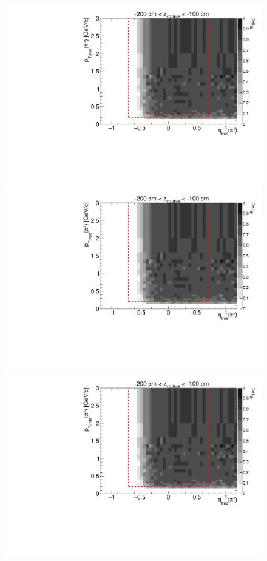 \begin{figure}[hb]\ContinuedFloat
\centering
\parbox{0.495\textwidth}{
  \centering
  \includegraphics[width=\linewidth,page=11]{graphics/eff/Eff2D_TPC_pion_Plus.pdf}\\
  \includegraphics[width=\linewidth,page=13]{graphics/eff/Eff2D_TPC_pion_Plus.pdf}\\
  \includegraphics[width=\linewidth,page=15]{graphics/eff/Eff2D_TPC_pion_Plus.pdf}\\
}
\end{figure}
